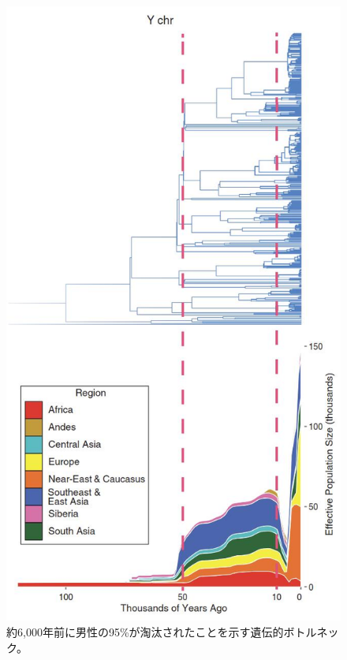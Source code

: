 \documentclass[10pt,twocolumn,letterpaper]{article}
\begin{document}
\begin{figure}[b]
\begin{center}
   \includegraphics[width=1\linewidth]{bottleneck.jpg}
\end{center}
   \caption{約6,000年前に男性の95\%が淘汰されたことを示す遺伝的ボトルネック\cite{62}。}
\label{fig:10}
\label{fig:onecol}
\end{figure}
\end{document}
